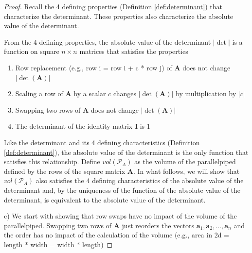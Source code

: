 \documentclass[
]{book}
\theoremstyle{definition}
\theoremstyle{definition}
\theoremstyle{definition}
\theoremstyle{remark}
\begin{document}
\begin{proof}

Recall the 4 defining properties (Definition \ref{def:determinant}) that characterize the determinant. These properties also characterize the absolute value of the determinant.

From the 4 defining properties, the absolute value of the determinant \(|\det|\) is a function on square \(n \times n\) matrices that satisfies the properties

\begin{enumerate}
\def\labelenumi{\alph{enumi})}
\item
  Row replacement (e.g., row i = row i + c * row j) of \(\mathbf{A}\) does not change \(|\det(\mathbf{A})|\)
\item
  Scaling a row of \(\mathbf{A}\) by a scalar \(c\) changes \(|\det(\mathbf{A})|\) by multiplication by \(|c|\)
\item
  Swapping two rows of \(\mathbf{A}\) does not change \(|\det(\mathbf{A})|\)
\item
  The determinant of the identity matrix \(\mathbf{I}\) is 1
\end{enumerate}

Like the determinant and its 4 defining characteristics (Definition \ref{def:determinant}), the absolute value of the determinant is the only function that satisfies this relationship. Define \(vol(\mathcal{P}_A)\) as the volume of the parallelpiped defined by the rows of the square matrix \(\mathbf{A}\). In what follows, we will show that \(vol(\mathcal{P}_A)\) also satisfies the 4 defining characteristics of the absolute value of the determinant and, by the uniqueness of the function of the absolute value of the determinant, is equivalent to the absolute value of the determinant.

c) We start with showing that row swaps have no impact of the volume of the parallelpiped. Swapping two rows of \(\mathbf{A}\) just reorders the vectors \(\mathbf{a}_1, \mathbf{a}_2, \ldots, \mathbf{a}_n\) and the order has no impact of the calculation of the volume (e.g., area in 2d = length * width = width * length)


\end{proof}
\end{document}
